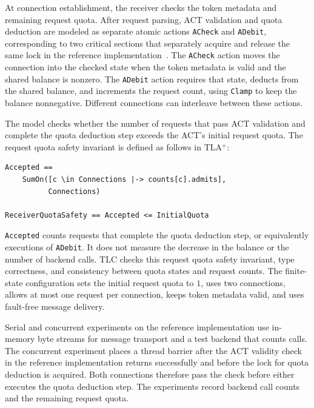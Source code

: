At connection establishment, the receiver checks the token metadata and remaining request quota. After request parsing, ACT validation and quota deduction are modeled as separate atomic actions \texttt{ACheck} and \texttt{ADebit}, corresponding to two critical sections that separately acquire and release the same lock in the reference implementation~\cite{sagaReferenceImpl2026}. The \texttt{ACheck} action moves the connection into the checked state when the token metadata is valid and the shared balance is nonzero. The \texttt{ADebit} action requires that state, deducts from the shared balance, and increments the request count, using \texttt{Clamp} to keep the balance nonnegative. Different connections can interleave between these actions.

The model checks whether the number of requests that pass ACT validation and complete the quota deduction step exceeds the ACT's initial request quota. The request quota safety invariant is defined as follows in TLA$^{+}$:

\begingroup
\renewcommand{\verbatimsize}{\footnotesize}
\setlength{\verbatimbaselineskip}{10pt}
\noindent\begin{minipage}{\linewidth}
\begin{verbatim}
Accepted ==
    SumOn([c \in Connections |-> counts[c].admits],
          Connections)

ReceiverQuotaSafety == Accepted <= InitialQuota
\end{verbatim}
\end{minipage}
\endgroup

\texttt{Accepted} counts requests that complete the quota deduction step, or equivalently executions of \texttt{ADebit}. It does not measure the decrease in the balance or the number of backend calls. TLC checks this request quota safety invariant, type correctness, and consistency between quota states and request counts. The finite-state configuration sets the initial request quota to $1$, uses two connections, allows at most one request per connection, keeps token metadata valid, and uses fault-free message delivery.

Serial and concurrent experiments on the reference implementation use in-memory byte streams for message transport and a test backend that counts calls. The concurrent experiment places a thread barrier after the ACT validity check in the reference implementation returns successfully and before the lock for quota deduction is acquired. Both connections therefore pass the check before either executes the quota deduction step. The experiments record backend call counts and the remaining request quota.
